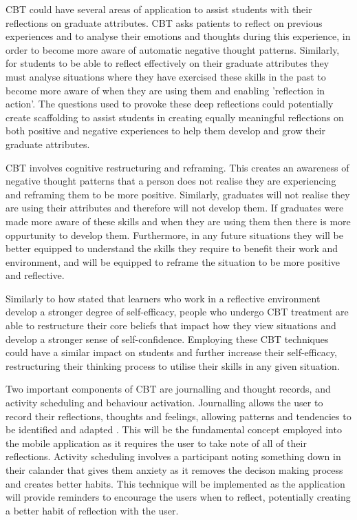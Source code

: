 \documentclass{l4proj}
\begin{document}
CBT could have several areas of application to assist students with their reflections on graduate attributes. CBT asks patients to reflect on previous experiences and to analyse their emotions and thoughts during this experience, in order to become more aware of automatic negative thought patterns. Similarly, for students to be able to reflect effectively on their graduate attributes they must analyse situations where they have exercised these skills in the past to become more aware of when they are using them and enabling 'reflection in action'. The questions used to provoke these deep reflections could potentially create scaffolding to assist students in creating equally meaningful reflections on both positive and negative experiences to help them develop and grow their graduate attributes.

CBT involves cognitive restructuring and reframing. This creates an awareness of negative thought patterns that a person does not realise they are experiencing and reframing them to be more positive. Similarly, graduates will not realise they are using their attributes and therefore will not develop them. If graduates were made more aware of these skills and when they are using them then there is more oppurtunity to develop them. Furthermore, in any future situations they will be better equipped to understand the skills they require to benefit their work and environment, and will be equipped to reframe the situation to be more positive and reflective.

Similarly to how \citet{bruno_reflective_2018} stated that learners who work in a reflective environment develop a stronger degree of self-efficacy, people who undergo CBT treatment are able to restructure their core beliefs that impact how they view situations and develop a stronger sense of self-confidence. Employing these CBT techniques could have a similar impact on students and further increase their self-efficacy, restructuring their thinking process to utilise their skills in any given situation. 

Two important components of CBT are journalling and thought records, and activity scheduling and behaviour activation. Journalling allows the user to record their reflections, thoughts and feelings, allowing patterns and tendencies to be identified and adapted \citep{ackerman_cbt_2017}. This will be the fundamental concept employed into the mobile application as it requires the user to take note of all of their reflections. Activity scheduling involves a participant noting something down in their calander that gives them anxiety as it removes the decison making process and creates better habits. This technique will be implemented as the application will provide reminders to encourage the users when to reflect, potentially creating a better habit of reflection with the user.
\end{document}
